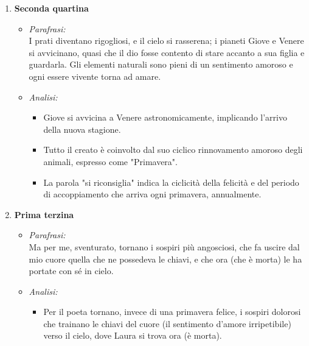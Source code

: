 \documentclass{article}
\begin{document}
\begin{enumerate}
\begin{enumerate}[label=]
\begin{itemize}[label=]
\begin{itemize}
\begin{itemize}
                                \end{itemize}
                        \end{itemize}
                \end{itemize}
                \newpage
            \item \textbf{Seconda quartina}
                \begin{itemize}[label=]
                    \item \textit{Parafrasi:}\\
                        I prati diventano rigogliosi, e il cielo si rasserena; i pianeti Giove e Venere si avvicinano, quasi che il dio fosse contento di stare accanto a sua figlia e guardarla. Gli elementi naturali sono pieni di un sentimento amoroso e ogni essere vivente torna ad amare.
                    \item \textit{Analisi:}
                        \begin{itemize}
                            \item Giove si avvicina a Venere astronomicamente, implicando l'arrivo della nuova stagione.
                            \item Tutto il creato è coinvolto dal suo ciclico rinnovamento amoroso degli animali, espresso come "Primavera".
                            \item La parola "si riconsiglia" indica la ciclicità della felicità e del periodo di accoppiamento che arriva ogni primavera, annualmente.
                        \end{itemize}
                \end{itemize}
            \item \textbf{Prima terzina}
                \begin{itemize}[label=]
                    \item \textit{Parafrasi:}\\
                        Ma per me, sventurato, tornano i sospiri più angosciosi, che fa uscire dal mio cuore quella che ne possedeva le chiavi, e che ora (che è morta) le ha portate con sé in cielo.
                    \item \textit{Analisi:}
                        \begin{itemize}
                            \item Per il poeta tornano, invece di una primavera felice, i sospiri dolorosi che trainano le chiavi del cuore (il sentimento d'amore irripetibile) verso il cielo, dove Laura si trova ora (è morta).

\end{itemize}
\end{itemize}
\end{enumerate}
\end{enumerate}
\end{document}
